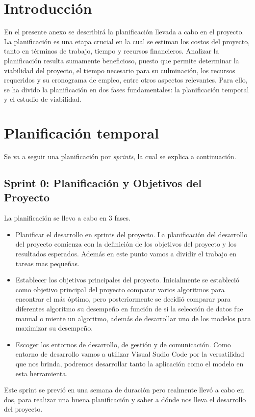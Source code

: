 
\section{Introducción}

En el presente anexo se describirá la planificación llevada a cabo en el proyecto. La planificación es una etapa crucial en la cual se estiman los costos del proyecto, tanto en términos de trabajo, tiempo y recursos financieros. Analizar la planificación resulta sumamente beneficioso, puesto que permite determinar la viabilidad del proyecto, el tiempo necesario para su culminación, los recursos requeridos y su cronograma de empleo, entre otros aspectos relevantes. Para ello, se ha divido la planificación en dos fases fundamentales: la planificación temporal y el estudio de viabilidad.

\section{Planificación temporal}

Se va a seguir una planificación por \textit{sprints}, la cual se explica a continuación.

\subsection{Sprint 0: Planificación y Objetivos del Proyecto}
La planificación se llevo a cabo en 3 fases.
\begin{itemize}
    \item
    Planificar el desarrollo en sprints del proyecto.
    La planificación del desarrollo del proyecto comienza con la definición de los objetivos del proyecto y los resultados esperados. Además en este punto vamos a dividir el trabajo en tareas mas pequeñas.
    \item
    Establecer los objetivos principales del proyecto.
    Inicialmente se estableció como objetivo principal del proyecto comparar varios algoritmos para encontrar el más óptimo, pero posteriormente se decidió comparar para diferentes algoritmo su desempeño en función de si la selección de datos fue manual o miente un algoritmo, además de desarrollar uno de los modelos para maximizar su desempeño.
    \item
    Escoger los entornos de desarrollo, de gestión y de comunicación.
    Como entorno de desarrollo vamos a utilizar Visual Sudio Code por la versatilidad que nos brinda, podremos desarrollar tanto la aplicación como el modelo en esta herramienta.
\end{itemize}
Este sprint se previó en una semana de duración pero realmente llevó a cabo en dos, para realizar una buena planificación y saber a dónde nos lleva el desarrollo del proyecto.

